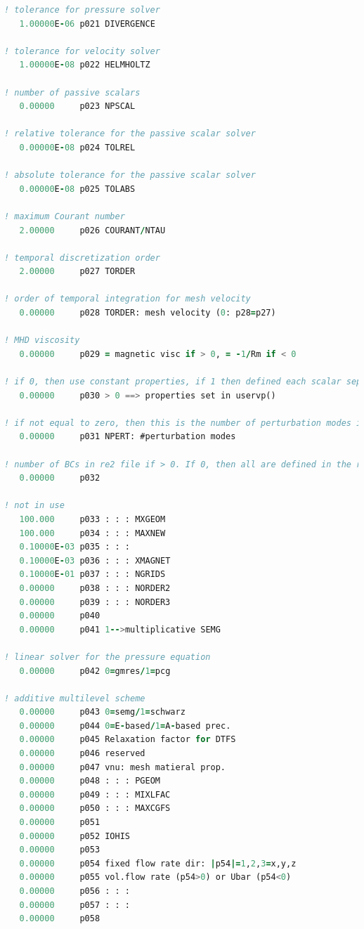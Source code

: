 \documentclass[10pt]{article}
\numberwithin{equation}{section} %
\begin{document}
\begin{itemize}
\begin{lstlisting}[language=Fortran]
! tolerance for pressure solver
   1.00000E-06 p021 DIVERGENCE
   
! tolerance for velocity solver
   1.00000E-08 p022 HELMHOLTZ
   
! number of passive scalars
   0.00000     p023 NPSCAL
   
! relative tolerance for the passive scalar solver
   0.00000E-08 p024 TOLREL
   
! absolute tolerance for the passive scalar solver
   0.00000E-08 p025 TOLABS
   
! maximum Courant number
   2.00000     p026 COURANT/NTAU
   
! temporal discretization order
   2.00000     p027 TORDER

! order of temporal integration for mesh velocity
   0.00000     p028 TORDER: mesh velocity (0: p28=p27)
   
! MHD viscosity
   0.00000     p029 = magnetic visc if > 0, = -1/Rm if < 0
   
! if 0, then use constant properties, if 1 then defined each scalar separately, and if 2 then set all scalars at once in the USERVP subroutine
   0.00000     p030 > 0 ==> properties set in uservp()

! if not equal to zero, then this is the number of perturbation modes in linearized N-S
   0.00000     p031 NPERT: #perturbation modes

! number of BCs in re2 file if > 0. If 0, then all are defined in the re2 file
   0.00000     p032
   
! not in use
   100.000     p033 : : : MXGEOM
   100.000     p034 : : : MAXNEW
   0.10000E-03 p035 : : :
   0.10000E-03 p036 : : : XMAGNET
   0.10000E-01 p037 : : : NGRIDS
   0.00000     p038 : : : NORDER2
   0.00000     p039 : : : NORDER3
   0.00000     p040
   0.00000     p041 1-->multiplicative SEMG

! linear solver for the pressure equation
   0.00000     p042 0=gmres/1=pcg
   
! additive multilevel scheme
   0.00000     p043 0=semg/1=schwarz
   0.00000     p044 0=E-based/1=A-based prec.
   0.00000     p045 Relaxation factor for DTFS
   0.00000     p046 reserved
   0.00000     p047 vnu: mesh matieral prop.
   0.00000     p048 : : : PGEOM
   0.00000     p049 : : : MIXLFAC
   0.00000     p050 : : : MAXCGFS
   0.00000     p051
   0.00000     p052 IOHIS
   0.00000     p053
   0.00000     p054 fixed flow rate dir: |p54|=1,2,3=x,y,z
   0.00000     p055 vol.flow rate (p54>0) or Ubar (p54<0)
   0.00000     p056 : : :
   0.00000     p057 : : :
   0.00000     p058


\end{lstlisting}
\end{itemize}
\end{document}
